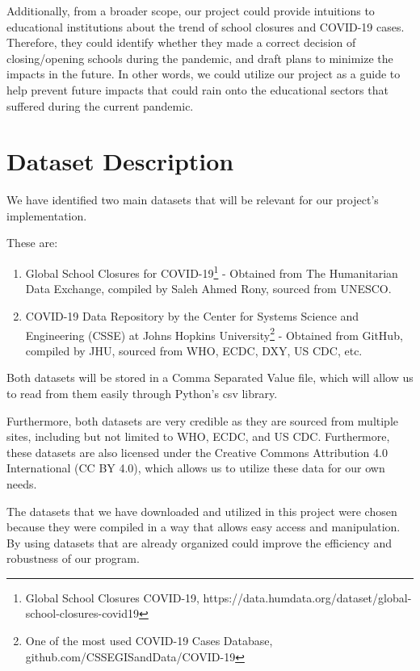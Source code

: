 \documentclass[fontsize=11pt]{article}
\begin{document}
    Additionally, from a broader scope, our project could provide intuitions to educational institutions about the trend of school closures and COVID-19 cases. Therefore, they could identify whether they made a correct decision of closing/opening schools during the pandemic, and draft plans to minimize the impacts in the future. In other words, we could utilize our project as a guide to help prevent future impacts that could rain onto the educational sectors that suffered during the current pandemic.

    \newpage

    \section{Dataset Description}

    We have identified two main datasets that will be relevant for our project's implementation.

    These are:

    \begin{enumerate}
        \item
        Global School Closures for COVID-19\footnote{Global School Closures COVID-19, https://data.humdata.org/dataset/global-school-closures-covid19} - Obtained from The Humanitarian Data Exchange, compiled by Saleh Ahmed Rony, sourced from UNESCO.

        \item
        COVID-19 Data Repository by the Center for Systems Science and Engineering (CSSE) at Johns Hopkins University\footnote{One of the most used COVID-19 Cases Database, github.com/CSSEGISandData/COVID-19} - Obtained from GitHub, compiled by JHU, sourced from WHO, ECDC, DXY, US CDC, etc.
    \end{enumerate}

    Both datasets will be stored in a Comma Separated Value file, which will allow us to read from them easily through Python's csv library.

    Furthermore, both datasets are very credible as they are sourced from multiple sites, including but not limited to WHO, ECDC, and US CDC. Furthermore, these datasets are also licensed under the Creative Commons Attribution 4.0 International (CC BY 4.0), which allows us to utilize these data for our own needs.

    The datasets that we have downloaded and utilized in this project were chosen because they were compiled in a way that allows easy access and manipulation. By using datasets that are already organized could improve the efficiency and robustness of our program.
\end{document}

